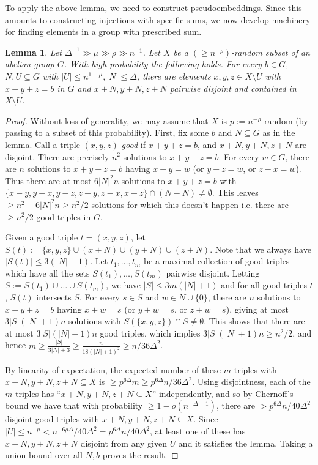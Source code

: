 \documentclass[a4paper,11pt,hidelinks]{amsart}
\newtheorem{lemma}[theorem]{Lemma}
\theoremstyle{definition}
\begin{document}
 
To apply the above lemma, we need to construct pseudoembeddings. Since this amounts to constructing injections with specific sums, we now develop machinery for finding elements in a group with prescribed sum.
\begin{lemma}\label{Lemma_three_elements_prescribed_sum_random}
Let $\Delta^{-1} \gg \mu \gg \rho\gg n^{-1}$.
Let $X$ be a $(\geq n^{-\rho})$-random subset of an abelian group $G$. With high probability the following holds. For every $b\in G$, $N,U\subseteq G$ with $|U|\leq n^{1-\mu}, |N|\leq \Delta$, there are elements $x,y,z\in X\setminus U$ with $x+y+z=b$ in $G$ and $x+N, y+N, z+N$ pairwise disjoint and contained in $X\setminus U$.
\end{lemma}
\begin{proof}
Without loss of generality, we may assume that $X$ is $p:=n^{-\rho}$-random (by passing to a subset of this probability).
First, fix some $b$ and $N\subseteq G$ as in the lemma.
Call a triple $(x,y,z)$ \textit{good} if $x+y+z=b$, and $x+N, y+N, z+N$ are disjoint.
There are precisely $n^2$ solutions to $x+y+z=b$. 
For every $w\in G$, there are $n$ solutions to $x+y+z=b$ having $x-y=w$ (or $y-z=w$, or $z-x=w$). Thus there are at most $6|N|^2n$ solutions to $x+y+z=b$ with $\{x-y,y-x,y-z,z-y,z-x,x-z\}\cap (N-N) \neq \emptyset$.  This leaves $\geq n^2-6|N|^2 n\geq n^2/2$ solutions for which this doesn't happen i.e. there are $\geq n^2/2$ good triples in $G$.

Given a good triple $t=(x,y,z)$, let $S(t):=\{x,y,z\}\cup (x+N)\cup (y+N)\cup (z+N)$. Note that we always have $|S(t)|\leq 3(|N|+1)$.
Let $t_1, \dots, t_m$ be a maximal collection of good triples which have all the sets $S(t_1), \dots, S(t_m)$ pairwise disjoint. 
Letting $S:=S(t_1)\cup\dots\cup S(t_m)$, we have $|S|\leq 3m(|N|+1)$ and for all good triples $t$, $S(t)$ intersects $S$. For every $s\in S$ and $w\in N\cup\{0\}$, there are $n$ solutions to $x+y+z=b$ having $x+w=s$ (or $y+w=s$, or $z+w=s$), giving at most $3|S|(|N|+1)n$ solutions with $S(\{x,y,z\})\cap S\neq \emptyset$. This shows that there are at most $3|S|(|N|+1)n$ good triples, which implies $3|S|(|N|+1)n\geq n^2/2$, and hence $m\geq \frac{|S|}{3|N|+3}\geq \frac{n}{18(|N|+1)^2} \geq n/36\Delta^2$.
 

By linearity of expectation, the expected number of these $m$ triples with $x+N,y+N, z+N\subseteq X$ is $\geq  p^{6\Delta}m\geq p^{6\Delta}n/36\Delta^2$. Using disjointness, each of the $m$ triples has ``$x+N,y+N, z+N\subseteq X$'' independently, and so by Chernoff's bound we have that with  probability $\geq1-o(n^{-\Delta-1})$, there are $> p^{6\Delta}n/40\Delta^2$ disjoint good triples with $x+N,y+N, z+N\subseteq X$. Since $|U|\leq n^{-\mu}< n^{-6\rho\Delta}/40\Delta^2= p^{6\Delta}n/40\Delta^2$, at least one of these has $x+N,y+N, z+N$ disjoint from any given $U$ and it satisfies the lemma. Taking a union bound over all $N, b$ proves the result.
\end{proof}
\end{document}
